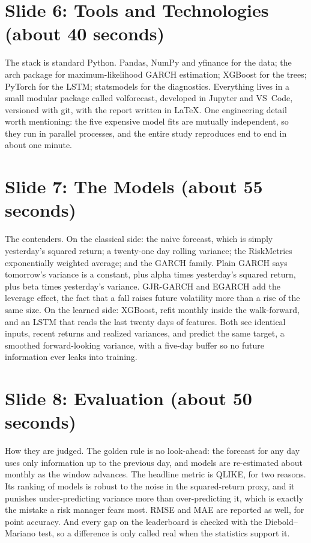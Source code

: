 \documentclass[a4paper,11pt]{article}
\begin{document}
\section*{Slide 6: Tools and Technologies (about 40 seconds)}

The stack is standard Python. Pandas, NumPy and yfinance for the data; the arch package for maximum-likelihood GARCH estimation; XGBoost for the trees; PyTorch for the LSTM; statsmodels for the diagnostics. Everything lives in a small modular package called volforecast, developed in Jupyter and VS~Code, versioned with git, with the report written in LaTeX. One engineering detail worth mentioning: the five expensive model fits are mutually independent, so they run in parallel processes, and the entire study reproduces end to end in about one minute.

\section*{Slide 7: The Models (about 55 seconds)}

The contenders. On the classical side: the naive forecast, which is simply yesterday's squared return; a twenty-one day rolling variance; the RiskMetrics exponentially weighted average; and the GARCH family. Plain GARCH says tomorrow's variance is a constant, plus alpha times yesterday's squared return, plus beta times yesterday's variance. GJR-GARCH and EGARCH add the leverage effect, the fact that a fall raises future volatility more than a rise of the same size. On the learned side: XGBoost, refit monthly inside the walk-forward, and an LSTM that reads the last twenty days of features. Both see identical inputs, recent returns and realized variances, and predict the same target, a smoothed forward-looking variance, with a five-day buffer so no future information ever leaks into training.

\section*{Slide 8: Evaluation (about 50 seconds)}

How they are judged. The golden rule is no look-ahead: the forecast for any day uses only information up to the previous day, and models are re-estimated about monthly as the window advances. The headline metric is QLIKE, for two reasons. Its ranking of models is robust to the noise in the squared-return proxy, and it punishes under-predicting variance more than over-predicting it, which is exactly the mistake a risk manager fears most. RMSE and MAE are reported as well, for point accuracy. And every gap on the leaderboard is checked with the Diebold–Mariano test, so a difference is only called real when the statistics support it.
\end{document}
